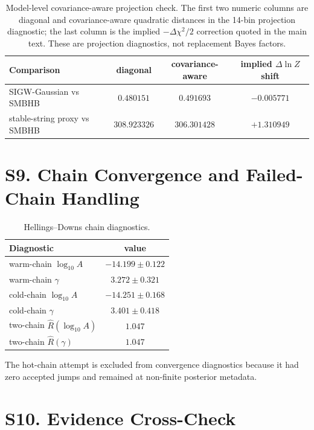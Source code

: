 \documentclass[aps,prl,superscriptaddress,nofootinbib]{revtex4-2}
\begin{document}
\begin{table}[H]
\caption{\label{tab:cov-proj}Model-level covariance-aware projection check.
The first two numeric columns are diagonal and covariance-aware quadratic
distances in the 14-bin projection diagnostic; the last column is the implied
$-\Delta\chi^2/2$ correction quoted in the main text.  These are projection
diagnostics, not replacement Bayes factors.}
\begin{ruledtabular}
\begin{tabular}{lccc}
Comparison & diagonal & covariance-aware & implied $\Delta\ln Z$ shift \\
\hline
SIGW-Gaussian vs SMBHB & $0.480151$ & $0.491693$ & $-0.005771$ \\
stable-string proxy vs SMBHB & $308.923326$ & $306.301428$ & $+1.310949$ \\
\end{tabular}
\end{ruledtabular}
\end{table}

\section*{S9. Chain Convergence and Failed-Chain Handling}

\begin{table}[H]
\caption{\label{tab:rhat}Hellings--Downs chain diagnostics.}
\begin{ruledtabular}
\begin{tabular}{lc}
Diagnostic & value \\
\hline
warm-chain $\log_{10}A$ & $-14.199\pm0.122$ \\
warm-chain $\gamma$ & $3.272\pm0.321$ \\
cold-chain $\log_{10}A$ & $-14.251\pm0.168$ \\
cold-chain $\gamma$ & $3.401\pm0.418$ \\
two-chain $\hat R(\log_{10}A)$ & $1.047$ \\
two-chain $\hat R(\gamma)$ & $1.047$ \\
\end{tabular}
\end{ruledtabular}
\end{table}

The hot-chain attempt is excluded from convergence diagnostics because it had
zero accepted jumps and remained at non-finite posterior metadata.

\section*{S10. Evidence Cross-Check}
\end{document}
